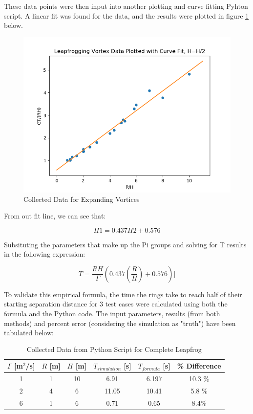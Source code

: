 \documentclass[10pt]{article}
\begin{document}
These data points were then input into another plotting and curve fitting Pyhton script. A linear fit was found for the data, and the results were plotted in figure \ref{fig:fit2} below.


\begin{figure}[H]
    \centering
    \includegraphics[width=0.7\linewidth]{figures/datafit_2.png}
    \caption{Collected Data for Expanding Vortices}
    \label{fig:fit2}
\end{figure}


From out fit line, we can see that:

\[\Pi1 = 0.437\Pi2 + 0.576  \]

Subsituting the parameters that make up the Pi groups and solving for T results in the following expression:

\[\boxed{T=\frac{RH}{\Gamma}(0.437(\frac{R}{H}) + 0.576)  ]}\]




To validate this empirical formula, the time the rings take to reach half of their starting separation distance for 3 test cases were calculated using both the formula and the Python code. The input parameters, results (from both methods) and percent error (considering the simulation as "truth") have been tabulated below:



\begin{table}[H]
    \centering
    \begin{tabular}{c c c c c c}
    $\Gamma$ [m$^2$/s]& $R$ [m]& $H$ [m]& $T_{simulation}$ [s] & $T_{formula}$ [s] & \% Difference \\ \hline
    1 & 1 & 10 & 6.91 & 6.197 & 10.3 \%\\
    2 & 4 & 6 & 11.05 & 10.41 & 5.8 \%\\
    6 & 1 & 6 & 0.71 & 0.65 &  8.4\% \\
    \end{tabular}
    \caption{Collected Data from Python Script for Complete Leapfrog}
    \label{tab:error_analysis_1}
\end{table}
\end{document}
